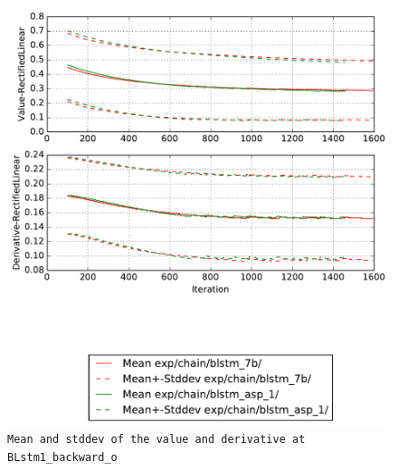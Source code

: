 \documentclass[prl,10pt,twocolumn]{revtex4}
\begin{document}
\newpage
\begin{figure}[h]
  \begin{center}
    \caption{\texttt{Mean and stddev of the value and derivative at BLstm1\_backward\_o}}
    \includegraphics[width=\textwidth]{exp/chain/blstm_7b/report/nonlinstats_BLstm1_backward_o.pdf}
  \end{center}
\end{figure}
\clearpage
\end{document}
